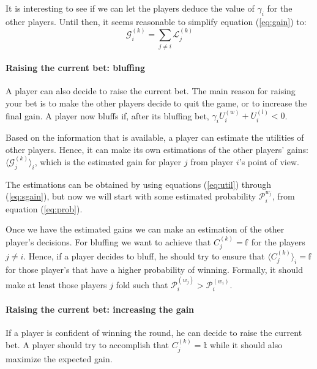 \documentclass[a4paper,10pt]{article}
\begin{document}
It is interesting to see if we can let the players deduce the value of $\gamma_i$ for the other players. Until then, it seems reasonable to simplify equation (\ref{eq:gain}) to:
\begin{equation}
\mathcal{G}^{(k)}_i = \sum_{j\neq i} \mathcal L^{(k)}_j
\label{eq:sgain}
\end{equation}


\paragraph{Raising the current bet: bluffing}
A player can also decide to raise the current bet. The main reason for raising your bet is to make the other players decide to quit the game, or to increase the final gain. A player now bluffs if, after its bluffing bet, $\gamma_i U^{(w)}_i + U^{(l)}_i < 0$. 

Based on the information that is available, a player can estimate the utilities of other players. Hence, it can make its own estimations of the other players' gains: $\langle \mathcal G^{(k)}_j \rangle_i$, which is the estimated gain for player $j$ from player $i$'s point of view. 

The estimations can be obtained by using equations (\ref{eq:util}) through (\ref{eq:sgain}), but now we will start with some estimated probability $\mathcal P^{w_j}_i$, from equation (\ref{eq:prob}).

Once we have the estimated gains we can make an estimation of the other player's decisions. For bluffing we want to achieve that $C^{(k)}_j = \mathbb{f}$ for the players $j\neq i$. Hence, if a player decides to bluff, he should try to ensure that $\langle C^{(k)}_j \rangle_i = \mathbb{f}$ for those player's that have a higher probability of winning. Formally, it should make at least those players $j$ fold such that $\mathcal P^{(w_j)}_i > \mathcal P^{(w_i)}_i$. 

\paragraph{Raising the current bet: increasing the gain}
If a player is confident of winning the round, he can decide to raise the current bet. A player should try to accomplish that $C^{(k)}_j = \mathbb{t}$ while it should also maximize the expected gain. 

\begin{comment}
\begin{figure}[!h]
 \centering
\begin{tikzpicture}
  \node [mystate] (a) at (0,0) {$\bullet$};
  \node [mystate] (b) at (5,0) {$\bullet$};
  \draw (a) node[below] {$\neg p, q, \neg r$};
  \draw (b) node[below] {$p, q, r$};
  \draw (a) node[above] {$w_1$};
  \draw (b) node[above] {$w_2$};
  \draw (a) to node[below] {$b$} (b);
\end{tikzpicture}
\caption{Simple world}
\label{fig:wrld}
\end{figure}
\end{comment}
\end{document}
